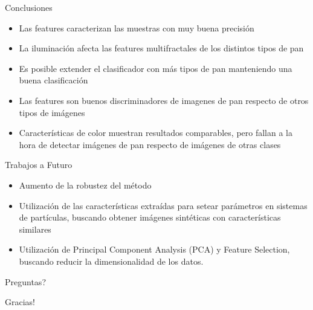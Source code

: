 \documentclass{beamer}
\begin{document}
\begin{frame}{Conclusiones}

\begin{itemize}
\item Las features caracterizan las muestras con muy buena precisi\'on
\item La iluminaci\'on afecta las features multifractales de los distintos tipos de pan
\item Es posible extender el clasificador con m\'as tipos de pan manteniendo una buena clasificaci\'on
\item Las features son buenos discriminadores de imagenes de pan respecto de otros tipos de im\'agenes
\item Caracter\'isticas de color muestran resultados comparables, pero fallan a la hora de detectar im\'agenes de pan respecto de im\'agenes de otras clases
\end{itemize}

\end{frame}

\begin{frame}{Trabajos a Futuro}

\begin{itemize}
\item Aumento de la robustez del m\'etodo
\item Utilizaci\'on de las caracter\'isticas extra\'idas para setear par\'ametros en sistemas de part\'iculas, buscando obtener im\'agenes sint\'eticas con caracter\'isticas similares
\item Utilizaci\'on de Principal Component Analysis (PCA) y Feature Selection, buscando reducir la dimensionalidad de los datos.
\end{itemize}

\end{frame}

\begin{frame}
\begin{center}
{\huge Preguntas?}
\end{center}
\end{frame}

\begin{frame}
\begin{center}
{\huge Gracias!}
\end{center}
\end{frame}
\end{document}
